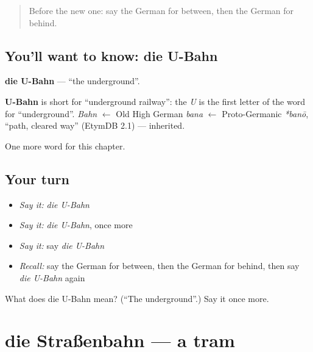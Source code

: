 \label{lesson:GE-C110-u-bahn}



\begin{quote}
Before the new one: say the German for between, then the German for behind.
\end{quote}

\subsection*{You'll want to know: die U-Bahn}
\textbf{die U-Bahn} — \textquotedblleft{}the underground\textquotedblright{}.

\begin{cousinweb}
\textbf{U-Bahn} is short for \textquotedblleft{}underground railway\textquotedblright{}: the \emph{U} is the first letter of the word for \textquotedblleft{}underground\textquotedblright{}. \emph{Bahn} $\leftarrow$ Old High German \emph{bana} $\leftarrow$ Proto-Germanic \emph{*banō}, \textquotedblleft{}path, cleared way\textquotedblright{} (EtymDB 2.1) — inherited.
\end{cousinweb}

\begin{grammarlens}[title={What you've built}]
One more word for this chapter.
\end{grammarlens}

\subsection*{Your turn}
\begin{itemize}
\raggedright
  \item \emph{Say it:} \emph{die U-Bahn}
  \item \emph{Say it:} \emph{die U-Bahn}, once more
  \item \emph{Say it:} say \emph{die U-Bahn}
  \item \emph{Recall:} say the German for between, then the German for behind, then say \emph{die U-Bahn} again
\end{itemize}

\begin{tcolorbox}[breakable,colback=teal!4,colframe=teal!35!black,title={Before you move on}]
What does die U-Bahn mean? (\textquotedblleft{}The underground\textquotedblright{}.) Say it once more.
\end{tcolorbox}
\section[die Straßenbahn]{die Straßenbahn — a tram}

